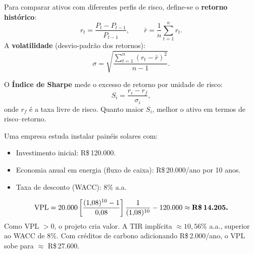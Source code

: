Para comparar ativos com diferentes perfis de risco, define-se o \textbf{retorno histórico}:
\[
  r_t = \frac{P_t - P_{t-1}}{P_{t-1}},
  \qquad
  \bar{r} = \frac{1}{n}\sum_{t=1}^n r_t.
\]
A \textbf{volatilidade} (desvio-padrão dos retornos):
\[
  \sigma = \sqrt{\frac{\sum_{t=1}^n (r_t - \bar{r})^2}{n-1}}.
\]

\begin{definicao}
O \textbf{Índice de Sharpe} mede o excesso de retorno por unidade de risco:
\[
  S_i = \frac{r_i - r_f}{\sigma_i},
\]
onde $r_f$ é a taxa livre de risco. Quanto maior $S_i$, melhor o ativo em termos de risco--retorno.
\end{definicao}

\begin{moderno}[title={Análise de projeto de energia solar (2025)}]
Uma empresa estuda instalar painéis solares com:
\begin{itemize}[leftmargin=1.8em, nosep]
  \item Investimento inicial: R\$\,120.000.
  \item Economia anual em energia (fluxo de caixa): R\$\,20.000/ano por 10 anos.
  \item Taxa de desconto (WACC): $8\%$ a.a.
\end{itemize}
\[
  \mathrm{VPL} = 20{.}000\left[\frac{(1{,}08)^{10}-1}{0{,}08}\right]\frac{1}{(1{,}08)^{10}} - 120{.}000
       \approx \textbf{R\$\,14.205.}
\]
Como VPL $> 0$, o projeto cria valor. A TIR implícita $\approx 10{,}56\%$ a.a., superior ao WACC de $8\%$.
Com créditos de carbono adicionando R\$\,2.000/ano, o VPL sobe para $\approx$ R\$\,27.600.
\end{moderno}

